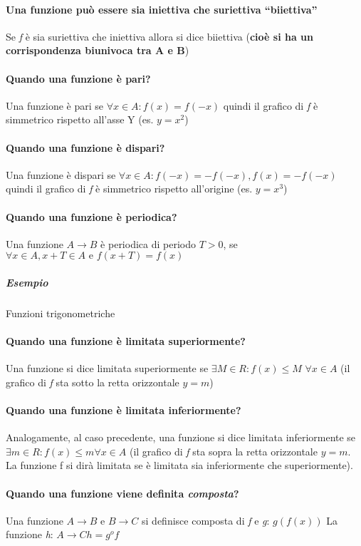 \paragraph{Una funzione può essere sia iniettiva che suriettiva ``biiettiva''}
Se \textit{f} è sia suriettiva che iniettiva allora si dice biiettiva (\textbf{cioè si
ha un corrispondenza biunivoca tra A e B})
\paragraph{Quando una funzione è pari?}
Una funzione è pari se $\forall x\in A: f(x)=f(-x)$ quindi il grafico di
\textit{f} è simmetrico rispetto all'asse Y (es. $y=x^2$)
\paragraph{Quando una funzione è dispari?}
Una funzione è dispari se $\forall x\in A: f(-x)=-f(-x), f(x)=-f(-x)$ quindi il
grafico di \textit{f} è simmetrico rispetto all'origine (es. $y=x^3$)
\paragraph{Quando una funzione è periodica?}
Una funzione $A\to B$ è periodica di periodo $T>0$, se $\forall x \in A, x+T\in
A \text{ e } f(x+T)=f(x)$ 
\subparagraph{Esempio} Funzioni trigonometriche
\paragraph{Quando una funzione è limitata superiormente?}
Una funzione si dice limitata superiormente se $\exists M\in R: f(x)\leq M$
$\forall x \in A$ (il grafico di \textit{f} sta sotto la retta orizzontale $y=m$)
\paragraph{Quando una funzione è limitata inferiormente?}
Analogamente, al caso precedente, una funzione si dice limitata inferiormente
se $\exists m\in R:f(x)\leq m \forall x \in A$ (il grafico di \textit{f} sta
sopra la retta orizzontale $y=m$. La funzione f si dirà limitata se è limitata
sia inferiormente che superiormente).
\paragraph{Quando una funzione viene definita \textit{composta}?}
Una funzione $A\to B \text{ e } B\to C$ si definisce composta di \textit{f} e
\textit{g}: $g(f(x))$ La funzione \textit{h}: $A\to C h=g^of$
\clearpage

